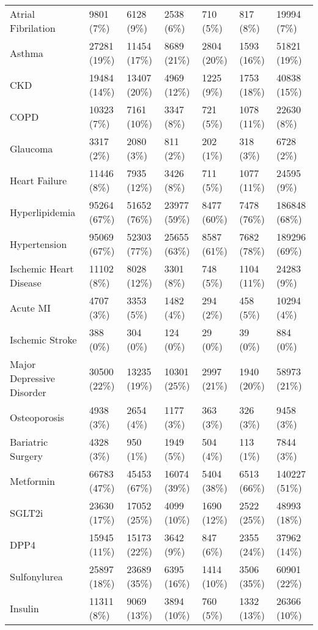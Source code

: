 \begin{longtable}{p{}p{}p{}p{}p{}p{}p{}}
  Atrial Fibrilation & 9801 (7\%) & 6128 (9\%) & 2538 (6\%) & 710 (5\%) & 817 (8\%) & 19994 (7\%) \\ 
  Asthma & 27281 (19\%) & 11454 (17\%) & 8689 (21\%) & 2804 (20\%) & 1593 (16\%) & 51821 (19\%) \\ 
  CKD & 19484 (14\%) & 13407 (20\%) & 4969 (12\%) & 1225 (9\%) & 1753 (18\%) & 40838 (15\%) \\ 
  COPD & 10323 (7\%) & 7161 (10\%) & 3347 (8\%) & 721 (5\%) & 1078 (11\%) & 22630 (8\%) \\ 
  Glaucoma & 3317 (2\%) & 2080 (3\%) & 811 (2\%) & 202 (1\%) & 318 (3\%) & 6728 (2\%) \\ 
  Heart Failure & 11446 (8\%) & 7935 (12\%) & 3426 (8\%) & 711 (5\%) & 1077 (11\%) & 24595 (9\%) \\ 
  Hyperlipidemia & 95264 (67\%) & 51652 (76\%) & 23977 (59\%) & 8477 (60\%) & 7478 (76\%) & 186848 (68\%) \\ 
  Hypertension & 95069 (67\%) & 52303 (77\%) & 25655 (63\%) & 8587 (61\%) & 7682 (78\%) & 189296 (69\%) \\ 
  Ischemic Heart Disease & 11102 (8\%) & 8028 (12\%) & 3301 (8\%) & 748 (5\%) & 1104 (11\%) & 24283 (9\%) \\ 
  Acute MI & 4707 (3\%) & 3353 (5\%) & 1482 (4\%) & 294 (2\%) & 458 (5\%) & 10294 (4\%) \\ 
  Ischemic Stroke & 388 (0\%) & 304 (0\%) & 124 (0\%) & 29 (0\%) & 39 (0\%) & 884 (0\%) \\ 
  Major Depressive Disorder & 30500 (22\%) & 13235 (19\%) & 10301 (25\%) & 2997 (21\%) & 1940 (20\%) & 58973 (21\%) \\ 
  Osteoporosis & 4938 (3\%) & 2654 (4\%) & 1177 (3\%) & 363 (3\%) & 326 (3\%) & 9458 (3\%) \\ 
  Bariatric Surgery & 4328 (3\%) & 950 (1\%) & 1949 (5\%) & 504 (4\%) & 113 (1\%) & 7844 (3\%) \\ 
  Metformin & 66783 (47\%) & 45453 (67\%) & 16074 (39\%) & 5404 (38\%) & 6513 (66\%) & 140227 (51\%) \\ 
  SGLT2i & 23630 (17\%) & 17052 (25\%) & 4099 (10\%) & 1690 (12\%) & 2522 (25\%) & 48993 (18\%) \\ 
  DPP4 & 15945 (11\%) & 15173 (22\%) & 3642 (9\%) & 847 (6\%) & 2355 (24\%) & 37962 (14\%) \\ 
  Sulfonylurea & 25897 (18\%) & 23689 (35\%) & 6395 (16\%) & 1414 (10\%) & 3506 (35\%) & 60901 (22\%) \\ 
  Insulin & 11311 (8\%) & 9069 (13\%) & 3894 (10\%) & 760 (5\%) & 1332 (13\%) & 26366 (10\%) \\ 

\end{longtable}
